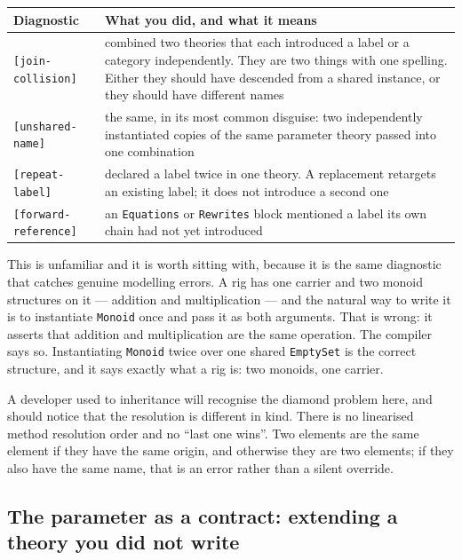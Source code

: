 \begin{center}
\small
\begin{tabular}{@{}L{0.30\textwidth}L{0.62\textwidth}@{}}
\toprule
\textbf{Diagnostic} & \textbf{What you did, and what it means} \\
\midrule
\texttt{[join-collision]} &
combined two theories that each introduced a label or a category
independently. They are two things with one spelling. Either they should have
descended from a shared instance, or they should have different names \\[3pt]
\texttt{[unshared-name]} &
the same, in its most common disguise: two independently instantiated copies of
the same parameter theory passed into one combination \\[3pt]
\texttt{[repeat-label]} &
declared a label twice in one theory. A replacement retargets an existing
label; it does not introduce a second one \\[3pt]
\texttt{[forward-reference]} &
an \texttt{Equations} or \texttt{Rewrites} block mentioned a label its own
chain had not yet introduced \\
\bottomrule
\end{tabular}
\end{center}

This is unfamiliar and it is worth sitting with, because it is the same
diagnostic that catches genuine modelling errors. A rig has one carrier and two
monoid structures on it --- addition and multiplication --- and the natural way
to write it is to instantiate \texttt{Monoid} once and pass it as both
arguments. That is wrong: it asserts that addition and multiplication are the
same operation. The compiler says so. Instantiating \texttt{Monoid} twice over
one shared \texttt{EmptySet} is the correct structure, and it says exactly what
a rig is: two monoids, one carrier.

A developer used to inheritance will recognise the diamond problem here, and
should notice that the resolution is different in kind. There is no linearised
method resolution order and no ``last one wins''. Two elements are the same
element if they have the same origin, and otherwise they are two elements; if
they also have the same name, that is an error rather than a silent override.

\subsection{The parameter as a contract: extending a theory you did not write}
\label{sec:loadtest}

